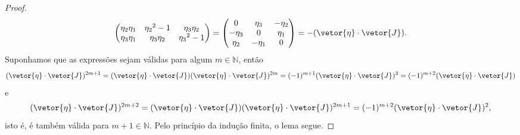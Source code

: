 \begin{proof}
\begin{equation*}
\begin{pmatrix}
            \eta_2 \eta_1 & {\eta_2}^2 - 1 & \eta_3 \eta_2\\
            \eta_3 \eta_1 & \eta_3 \eta_2 & {\eta_3}^2 - 1
        \end{pmatrix} =
        \begin{pmatrix}
            0 & \eta_3 & -\eta_2\\
            -\eta_3 & 0 & \eta_1\\
            \eta_2 & -\eta_1 & 0
        \end{pmatrix} = -(\vetor{\eta} \cdot \vetor{J}).
    \end{equation*}
    Suponhamos que as expressões sejam válidas para algum \(m \in \mathbb{N}\), então
    \begin{equation*}
        (\vetor{\eta}\cdot \vetor{J})^{2m + 1} = (\vetor{\eta}\cdot\vetor{J})(\vetor{\eta}\cdot{\vetor{J}})^{2m} = (-1)^{m+1} (\vetor{\eta}\cdot \vetor{J})^3 = (-1)^{m+2} (\vetor{\eta}\cdot \vetor{J})
    \end{equation*}
    e
    \begin{equation*}
        (\vetor{\eta}\cdot \vetor{J})^{2m+2} = (\vetor{\eta}\cdot\vetor{J})(\vetor{\eta}\cdot\vetor{J})^{2m+1} = (-1)^{m+2} (\vetor{\eta}\cdot{\vetor{J}})^2,
    \end{equation*}
    isto é, é também válida para \(m +1 \in \mathbb{N}\). Pelo princípio da indução finita, o lema segue.
\end{proof}

